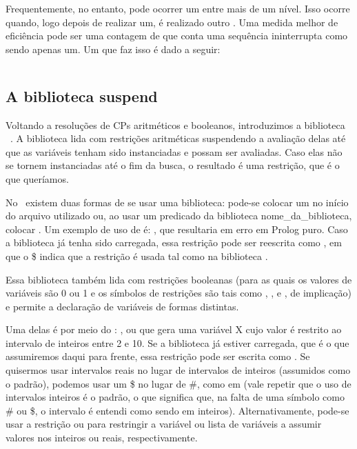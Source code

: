 Frequentemente, no entanto, pode ocorrer um  entre mais de um nível. Isso
ocorre quando, logo depois de realizar um, é realizado outro . Uma medida
melhor de eficiência pode ser uma contagem de  que conta uma sequência
ininterrupta como sendo apenas um. Um  que faz isso é dado a seguir:

    \begin{listing}
\inputminted{prolog}{../Exemplos/Cap8/prog6_conta_backtrack.pl}
    \end{listing}

\subsection{A biblioteca suspend}

Voltando a resoluções de CPs aritméticos e booleanos, introduzimos a biblioteca \eclipse\ . A biblioteca  lida com restrições aritméticas suspendendo a avaliação delas até que as variáveis tenham sido instanciadas e possam ser avaliadas. Caso elas não se tornem instanciadas até o fim da busca, o resultado é uma restrição, que é o que queríamos.

No \eclipse\ existem duas formas de se usar uma biblioteca: pode-se colocar um  no início do arquivo utilizado ou, ao usar um predicado da biblioteca nome\_da\_biblioteca, colocar . Um exemplo de uso de  é: , que resultaria em erro em Prolog puro. Caso a biblioteca  já tenha sido carregada, essa restrição pode ser reescrita como ,
em que o \$ indica que a restrição é usada tal como na biblioteca .

Essa biblioteca também lida com restrições booleanas (para as quais os valores de variáveis são 0 ou
1 e os símbolos de restrições são tais como , ,  e
, de implicação) e permite a declaração de variáveis de formas distintas.

Uma delas é por meio do : , ou 
que gera uma variável X cujo valor é restrito ao intervalo de inteiros entre 2 e 10. Se a biblioteca já estiver carregada, que é o que assumiremos daqui para frente, essa restrição pode ser escrita como .
Se quisermos usar intervalos reais no lugar de intervalos de inteiros (assumidos como o padrão),
podemos usar um \$ no lugar de \#, como em  (vale repetir que o uso de
intervalos inteiros é o padrão, o que significa que, na falta de uma símbolo como  \# ou \$, o
intervalo é entendi como sendo em inteiros).
Alternativamente, pode-se usar a restrição  ou  para restringir a variável ou lista de variáveis a assumir valores nos inteiros ou reais, respectivamente.



